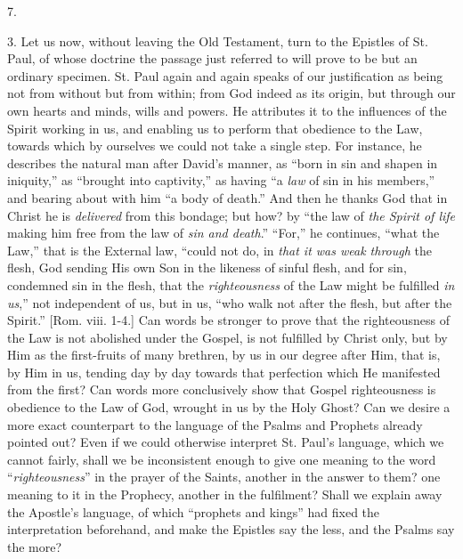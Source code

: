 7.

3. Let us now, without leaving the Old Testament, turn to the
Epistles of St. Paul, of whose doctrine the passage just referred to
will prove to be but an ordinary specimen. St. Paul again and again
speaks of our justification as being not from without but from
within; from God indeed as its origin, but through our own hearts and
minds, wills and powers. He attributes it to the influences of the
Spirit working in us, and enabling us to perform that obedience to the
Law, towards which by ourselves we could not take a single step. For
instance, he describes the natural man after David's manner, as
``born in sin and shapen in iniquity,'' as ``brought into
captivity,'' as having ``a \emph{law} of sin in his members,'' and bearing about with him ``a body of
death.'' And then he thanks God that in Christ he is \emph{delivered}
from this bondage; but how? by ``the law of \emph{the Spirit of life}
making him free from the law of \emph{sin and death}.''
``For,'' he continues, ``what the Law,'' that is the
External law, ``could not do, in \emph{that it was weak through}
the flesh, God sending His own Son in the likeness of sinful flesh,
and for sin, condemned sin in the flesh, that the \emph{righteousness}
of the Law might be fulfilled \emph{in us},'' not independent of
us, but in us, ``who walk not after the flesh, but after the
Spirit.'' [Rom. viii. 1-4.] Can words be stronger to prove that
the righteousness of the Law is not abolished under the Gospel, is not
fulfilled by Christ only, but by Him as the first-fruits of many
brethren, by us in our degree after Him, that is, by Him in us,
tending day by day towards that perfection which He manifested from
the first? Can words more conclusively show that Gospel righteousness
is obedience to the Law of God, wrought in us by the Holy Ghost? Can
we desire a more exact counterpart to the language of the Psalms and
Prophets already pointed out? Even if we could otherwise
interpret St. Paul's language, which we cannot fairly, shall we be
inconsistent enough to give one meaning to the word ``\emph{righteousness}''
in the prayer of the Saints, another in the answer to them? one
meaning to it in the Prophecy, another in the fulfilment? Shall we
explain away the Apostle's language, of which ``prophets and
kings'' had fixed the interpretation beforehand, and make the
Epistles say the less, and the Psalms say the more?

